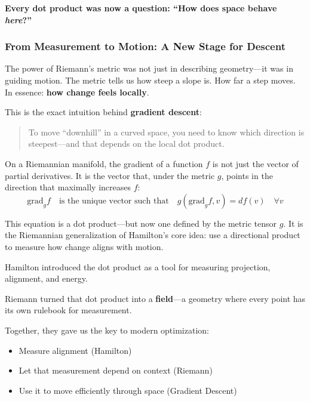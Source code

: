 \textbf{Every dot product was now a question: “How does space behave \textit{here}?”}

\subsubsection*{From Measurement to Motion: A New Stage for Descent}

The power of Riemann’s metric was not just in describing geometry—it was in guiding motion.  
The metric tells us how steep a slope is. How far a step moves.  
In essence: \textbf{how change feels locally}.

This is the exact intuition behind \textbf{gradient descent}:

\begin{quote}
To move “downhill” in a curved space, you need to know which direction is steepest—and that depends on the local dot product.
\end{quote}

On a Riemannian manifold, the gradient of a function \( f \) is not just the vector of partial derivatives. It is the vector that, under the metric \( g \), points in the direction that maximally increases \( f \):
\[
\text{grad}_g f \quad \text{is the unique vector such that} \quad g(\text{grad}_g f, v) = df(v) \quad \forall v
\]

This equation is a dot product—but now one defined by the metric tensor \( g \). It is the Riemannian generalization of Hamilton’s core idea: use a directional product to measure how change aligns with motion.

\begin{tcolorbox}[colback=blue!5!white, colframe=blue!50!black,
title={Sidebar: Hamilton’s Dot Product Grows Up}]
Hamilton introduced the dot product as a tool for measuring projection, alignment, and energy.

Riemann turned that dot product into a \textbf{field}—a geometry where every point has its own rulebook for measurement.

Together, they gave us the key to modern optimization:
\begin{itemize}
  \item Measure alignment (Hamilton)
  \item Let that measurement depend on context (Riemann)
  \item Use it to move efficiently through space (Gradient Descent)
\end{itemize}
\end{tcolorbox}

